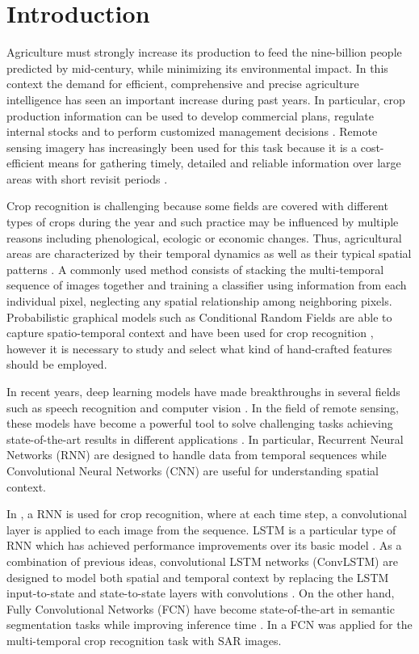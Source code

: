 
\section{Introduction}

Agriculture must strongly increase its production to feed the nine-billion people predicted by mid-century, while minimizing its environmental impact. In this context the demand for efficient, comprehensive and precise agriculture intelligence has seen an important increase during past years. In particular, crop production information can be used to develop commercial plans, regulate internal stocks and to perform customized management decisions \cite{leite2011hidden}. Remote sensing imagery has increasingly been used for this task because it is a cost-efficient means for gathering timely, detailed and reliable information over large areas with short revisit periods \cite{thenkabail2015land}.

Crop recognition is challenging because some fields are covered with different types of crops during the year and such practice may be influenced by multiple reasons including phenological, ecologic or economic changes. Thus, agricultural areas are characterized by their temporal dynamics as well as their typical spatial patterns \cite{lohmann2008multi}. 
A commonly used method consists of stacking the multi-temporal sequence of images together and training a classifier using information from each individual pixel, neglecting any spatial relationship among neighboring pixels. Probabilistic graphical models such as Conditional Random Fields are able to capture spatio-temporal context and have been used for crop recognition \cite{achanccaray2017spatial}, however it is necessary to study and select what kind of hand-crafted features should be employed. 

In recent years, deep learning models have made breakthroughs in several fields such as speech recognition and computer vision \cite{lecun2015deep}. In the field of remote sensing, these models have become a powerful tool to solve challenging tasks achieving state-of-the-art results in different applications \cite{audebertdeep}. In particular, Recurrent Neural Networks (RNN) are designed to handle data from temporal sequences while Convolutional Neural Networks (CNN) are useful for understanding spatial context. 

In \cite{rnnjose}, a RNN is used for crop recognition, where at each time step, a convolutional layer is applied to each image from the sequence. LSTM is a particular type of RNN which has achieved performance improvements over its basic model \cite{mou2018learning}. As a combination of previous ideas, convolutional LSTM networks (ConvLSTM) are designed to model both spatial and temporal context by replacing the LSTM input-to-state and state-to-state layers with convolutions \cite{xingjian2015convolutional}. On the other hand, Fully Convolutional Networks (FCN) have become state-of-the-art in semantic segmentation tasks while improving inference time \cite{long2015fully}. In \cite{fcnlaura} a FCN was applied for the multi-temporal crop recognition task with SAR images.

